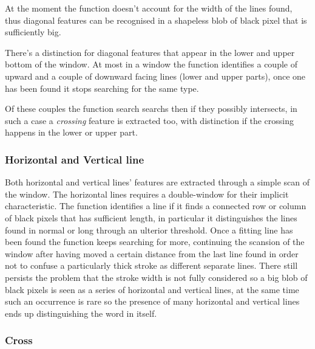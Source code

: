 At the moment the function doesn't account for the width of the lines found, thus diagonal features can be recognised in a shapeless blob of black pixel that is sufficiently big. 
   
There's a distinction for diagonal features that appear in the lower and upper bottom of the window.
At most in a window the function identifies a couple of upward and a couple of downward facing lines (lower and upper parts), once one has been found it stops searching for the same type.

Of these couples the function search searchs then if they possibly intersects, in such a case a \emph{crossing} feature is extracted too, with distinction if the crossing happens in the lower or upper part. 

\subsubsection{Horizontal and Vertical line}
Both horizontal and vertical lines' features are extracted through
a simple scan of the window.
The horizontal lines requires a double-window for their implicit characteristic.
The function identifies a line if it finds a connected row or column of black pixels that has sufficient length, in particular it distinguishes the lines found in normal or long through an ulterior threshold.
Once a fitting line has been found the function keeps searching for more, continuing the scansion of the window after having moved a certain distance from the last line found in order not to confuse a particularly thick stroke as different separate lines.
There still persists the problem that the stroke width is not fully considered so a big blob of black pixels is seen as a series of horizontal and vertical lines, at the same time such an occurrence is rare so the presence of many horizontal and vertical lines ends up distinguishing the word in itself.     

\subsubsection{Cross}  